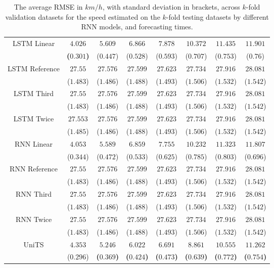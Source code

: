 \begin{table}[!ht]
{\begin{tabular}{|c|c|c|c|c|c|c|c|}
			\multirow{2}{*}{LSTM Linear} & $\mathbf{4.026}$ & $5.609$ & $6.866$ & $7.878$ & $10.372$ & $11.435$ & $11.901$ \\
			 & \textbf{(}$\mathbf{0.301}$\textbf{)} & ($0.447$) & ($0.528$) & ($0.593$) & ($0.707$) & ($0.753$) & ($0.76$) \\ \hline
			\multirow{2}{*}{LSTM Reference} & $27.55$ & $27.576$ & $27.599$ & $27.623$ & $27.734$ & $27.916$ & $28.081$ \\
			 & ($1.483$) & ($1.486$) & ($1.488$) & ($1.493$) & ($1.506$) & ($1.532$) & ($1.542$) \\ \hline
			\multirow{2}{*}{LSTM Third} & $27.55$ & $27.576$ & $27.599$ & $27.623$ & $27.734$ & $27.916$ & $28.081$ \\
			 & ($1.483$) & ($1.486$) & ($1.488$) & ($1.493$) & ($1.506$) & ($1.532$) & ($1.542$) \\ \hline
			\multirow{2}{*}{LSTM Twice} & $27.553$ & $27.576$ & $27.599$ & $27.623$ & $27.734$ & $27.916$ & $28.081$ \\
			 & ($1.485$) & ($1.486$) & ($1.488$) & ($1.493$) & ($1.506$) & ($1.532$) & ($1.542$) \\ \hline
			\multirow{2}{*}{RNN Linear} & $4.053$ & $5.589$ & $6.859$ & $7.755$ & $10.232$ & $11.323$ & $11.807$ \\
			 & ($0.344$) & ($0.472$) & ($0.533$) & ($0.625$) & ($0.785$) & ($0.803$) & ($0.696$) \\ \hline
			\multirow{2}{*}{RNN Reference} & $27.55$ & $27.576$ & $27.599$ & $27.623$ & $27.734$ & $27.916$ & $28.081$ \\
			 & ($1.483$) & ($1.486$) & ($1.488$) & ($1.493$) & ($1.506$) & ($1.532$) & ($1.542$) \\ \hline
			\multirow{2}{*}{RNN Third} & $27.55$ & $27.576$ & $27.599$ & $27.623$ & $27.734$ & $27.916$ & $28.081$ \\
			 & ($1.483$) & ($1.486$) & ($1.488$) & ($1.493$) & ($1.506$) & ($1.532$) & ($1.542$) \\ \hline
			\multirow{2}{*}{RNN Twice} & $27.55$ & $27.576$ & $27.599$ & $27.623$ & $27.734$ & $27.916$ & $28.081$ \\
			 & ($1.483$) & ($1.486$) & ($1.488$) & ($1.493$) & ($1.506$) & ($1.532$) & ($1.542$) \\ \hline
			\multirow{2}{*}{UniTS} & $4.353$ & $\mathbf{5.246}$ & $\mathbf{6.022}$ & $\mathbf{6.691}$ & $\mathbf{8.861}$ & $\mathbf{10.555}$ & $\mathbf{11.262}$ \\
			 & ($0.296$) & \textbf{(}$\mathbf{0.369}$\textbf{)} & \textbf{(}$\mathbf{0.424}$\textbf{)} & \textbf{(}$\mathbf{0.473}$\textbf{)} & \textbf{(}$\mathbf{0.639}$\textbf{)} & \textbf{(}$\mathbf{0.772}$\textbf{)} & \textbf{(}$\mathbf{0.754}$\textbf{)} \\ \hline
		\end{tabular}
	}
	\caption{The average RMSE in $km/h$, with standard deviation in brackets, across $k$-fold validation datasets for the speed estimated on the $k$-fold testing datasets by different RNN models, and forecasting times.}
	\label{tab:all_speed_RMSE}
\end{table}